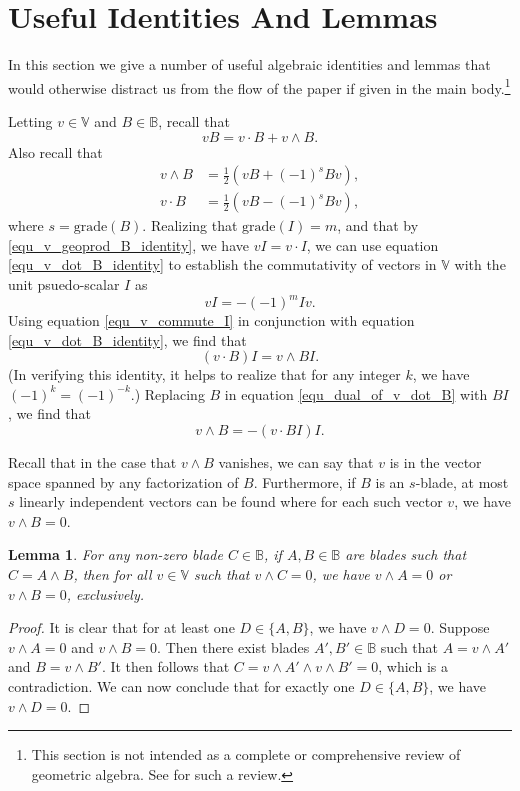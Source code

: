 \documentclass{birkjour}
\newtheorem{lem}[thm]{Lemma}
\theoremstyle{definition}
\theoremstyle{remark}
\numberwithin{equation}{section}
\newcommand{\B}{\mathbb{B}}
\newcommand{\V}{\mathbb{V}}
\newcommand{\grade}{\mbox{grade}}
\begin{document}
\section{Useful Identities And Lemmas}\label{sec_useful_identities}

In this section we give a number of useful algebraic identities and lemmas that would
otherwise distract us from the flow of the paper if given in the main body.\footnote{This
section is not intended as a complete or comprehensive review of geometric algebra.
See \cite{} for such a review.}

Letting $v\in\V$ and $B\in\B$, recall that
\begin{equation}\label{equ_v_geoprod_B_identity}
vB = v\cdot B+v\wedge B.
\end{equation}
Also recall that
\begin{align}
v\wedge B &= \frac{1}{2}(vB+(-1)^sBv),\label{equ_v_wedge_B_identity} \\
v\cdot B &= \frac{1}{2}(vB-(-1)^sBv),\label{equ_v_dot_B_identity}
\end{align}
where $s=\grade(B)$.
Realizing that $\grade(I)=m$, and that by \eqref{equ_v_geoprod_B_identity}, we have $vI=v\cdot I$, we can use
equation \eqref{equ_v_dot_B_identity} to establish the commutativity of vectors in $\V$ with the unit psuedo-scalar $I$ as
\begin{equation}\label{equ_v_commute_I}
vI = -(-1)^mIv.
\end{equation}
Using equation \eqref{equ_v_commute_I} in conjunction with equation \eqref{equ_v_dot_B_identity}, we find that
\begin{equation}\label{equ_dual_of_v_dot_B}
(v\cdot B)I = v\wedge BI.
\end{equation}
(In verifying this identity, it helps to realize that for any integer $k$, we have $(-1)^k=(-1)^{-k}$.)
Replacing $B$ in equation \eqref{equ_dual_of_v_dot_B} with $BI$, we find that
\begin{equation}\label{equ_dual_of_v_dot_dual_B}
v\wedge B = -(v\cdot BI)I.
\end{equation}

Recall that in the case that $v\wedge B$ vanishes, we can say that $v$ is
in the vector space spanned by any factorization of $B$.  Furthermore,
if $B$ is an $s$-blade, at most $s$ linearly independent vectors can be
found where for each such vector $v$, we have $v\wedge B=0$.

\begin{lem}
For any non-zero blade $C\in\B$, if $A,B\in\B$ are blades such that
$C=A\wedge B$, then for all $v\in\V$ such that $v\wedge C=0$, we have
$v\wedge A=0$ or $v\wedge B=0$, exclusively.
\end{lem}
\begin{proof}
It is clear that for at least one $D\in\{A,B\}$, we have $v\wedge D=0$.
Suppose $v\wedge A=0$ and $v\wedge B=0$.  Then there exist blades $A',B'\in\B$
such that $A=v\wedge A'$ and $B=v\wedge B'$.  It then follows that
$C=v\wedge A'\wedge v\wedge B'=0$, which is a contradiction.
We can now conclude that for exactly one $D\in\{A,B\}$, we have $v\wedge D=0$.
\end{proof}
\end{document}
